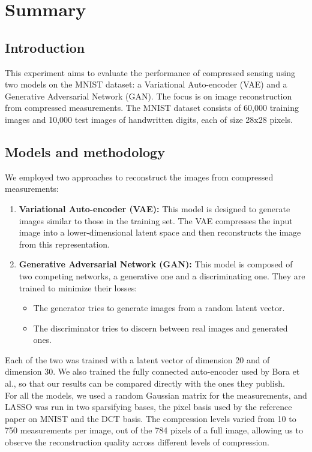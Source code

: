 \section{Summary}

\vspace{1cm}

\subsection{Introduction}

This experiment aims to evaluate the performance of compressed sensing using two models on the MNIST dataset: a Variational Auto-encoder (VAE) and a Generative Adversarial Network (GAN). The focus is on image reconstruction from compressed measurements. The MNIST dataset consists of 60,000 training images and 10,000 test images of handwritten digits, each of size 28x28 pixels.

\subsection{Models and methodology}

We employed two approaches to reconstruct the images from compressed measurements:
\begin{enumerate}
    \item \textbf{Variational Auto-encoder (VAE):} This model is designed to generate images similar to those in the training set. The VAE compresses the input image into a lower-dimensional latent space and then reconstructs the image from this representation.
    \item \textbf{Generative Adversarial Network (GAN):} This model is composed of two competing networks, a generative one and a discriminating one. They are trained to minimize their losses:
    \begin{itemize}
        \item The generator tries to generate images from a random latent vector.
        \item The discriminator tries to discern between real images and generated ones.
    \end{itemize}
\end{enumerate}
Each of the two was trained with a latent vector of dimension 20 and of dimension 30. We also trained the fully connected auto-encoder used by Bora et al., so that our results can be compared directly with the ones they publish.
\\
For all the models, we used a random Gaussian matrix for the measurements, and LASSO was run in two sparsifying bases, the pixel basis used by the reference paper on MNIST and the DCT basis. The compression levels varied from 10 to 750 measurements per image, out of the 784 pixels of a full image, allowing us to observe the reconstruction quality across different levels of compression.

